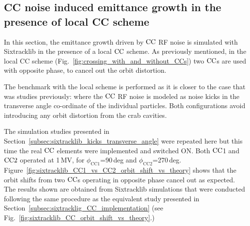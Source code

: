 \subsection{CC noise induced emittance growth in the presence of local CC scheme}\label{subsec:local_CC_sixtracklib}


In this section, the emittance growth driven by ${\mathrm{CC}}$ RF noise is simulated with Sixtracklib in the presence of a local ${\mathrm{CC}}$ scheme. As previously mentioned, in the local CC scheme (Fig.~\ref{fig:crossing_with_and_without_CCs}) two ${\mathrm{CC}}$s are used with opposite phase, to cancel out the orbit distortion.


The benchmark with the local scheme is performed as it is closer to the case that was studies previously: where the ${\mathrm{CC}}$ RF noise is modeled as noise kicks in the transverse angle co-ordinate of the individual particles. Both configurations avoid introducing any orbit distortion from the crab cavities.

The simulation studies presented in Section~\ref{subsec:sixtracklib_kicks_transverse_angle} were repeated here but this time the real ${\mathrm{CC}}$ elements were implemented and switched ON. Both ${\mathrm{CC}}$1 and ${\mathrm{CC}}2$ operated at 1\,MV, for $\phi_\mathrm{CC1}$=90\,deg and  $\phi_\mathrm{CC2}$=270\,deg. Figure~\ref{fig:sixtracklib_CC1_vs_CC2_orbit_shift_vs_theory} shows that the orbit shifts from two ${\mathrm{CC}}$s operating in opposite phase cancel out as expected. The results shown are obtained from Sixtracklib simulations that were conducted following the same procedure as the equivalent study presented in Section~\ref{subsec:sixtracklig_CC_implementation} (see Fig.~\ref{fig:sixtracklib_CC_orbit_shift_vs_theory}.)

